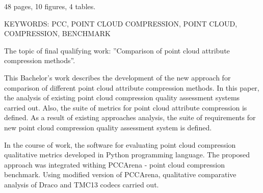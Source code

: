48 pages, 10 figures, 4 tables.

KEYWORDS: PCC, POINT CLOUD COMPRESSION, POINT CLOUD, COMPRESSION, BENCHMARK

The topic of final qualifying work: ''Comparison of point cloud attribute compression methods''.

This Bachelor's work describes the development of the new approach for
comparison of different point cloud attribute compression methods. In this
paper, the analysis of existing point cloud compression quality assessment
systems carried out. Also, the suite of metrics for point cloud attribute
compression is defined. As a result of existing approaches analysis, the suite
of requirements for new point cloud compression quality assessment system is
defined.

In the course of work, the software for evaluating point cloud compression
qualitative metrics developed in Python programming language. The proposed
approach was integrated withing PCCArena - point cloud compression benchmark.
Using modified version of PCCArena, qualitative comparative analysis of Draco
and TMC13 codecs carried out.